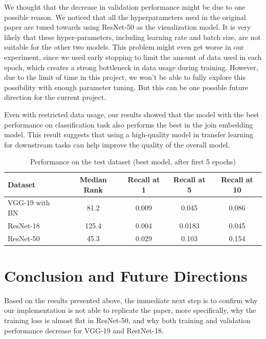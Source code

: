 \documentclass[10pt,twocolumn,letterpaper]{article}
\begin{document}
We thought that the decrease in validation performance might be due to one possible reason.  We noticed that all the hyperparameters used in the original paper are tuned towards using ResNet-50 as the visualization model.  It is very likely that these hyper-parameters, including learning rate and batch size, are not suitable for the other two models.  This problem might even get worse in our experiment, since we used early stopping to limit the amount of data used in each epoch, which creates a strong bottleneck in data usage during training.  However, due to the limit of time in this project, we won't be able to fully explore this possibility with enough parameter tuning.  But this can be one possible future direction for the current project.

Even with restricted data usage, our results showed that the model with the best performance on classification task also performs the best in the join embedding model.  This result suggests that using a high-quality model in transfer learning for downstream tasks can help improve the quality of the overall model.

\begin{table}
\begin{center}
\begin{tabular}{|l|c|c|c|c|}
\hline
Dataset & Median Rank & Recall at 1 & Recall at 5 & Recall at 10 \\
\hline\hline
VGG-19 with BN & 81.2 & 0.009 & 0.045 & 0.086 \\
ResNet-18 & 125.4 & 0.004 & 0.0183 & 0.045 \\
ResNet-50 & 45.3 & 0.029 & 0.103 & 0.154 \\
\hline
\end{tabular}
\end{center}
\caption{Performance on the test dataset (best model, after first 5 epochs)}
\label{tab:perfontest}
\end{table}

\section{Conclusion and Future Directions}

Based on the results presented above, the immediate next step is to confirm why our implementation is not able to replicate the paper, more specifically, why the training loss is almost flat in ResNet-50, and why both training and validation performance decrease for VGG-19 and RestNet-18. 
\end{document}
